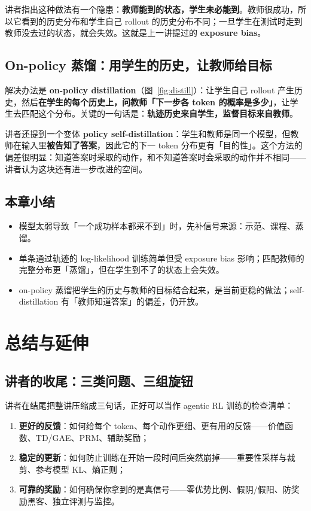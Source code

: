 \documentclass[a4paper]{article}
\begin{document}
讲者指出这种做法有一个隐患：\textbf{教师能到的状态，学生未必能到}。教师很成功，所以它看到的历史分布和学生自己 rollout 的历史分布不同；一旦学生在测试时走到教师没去过的状态，就会失效。这就是上一讲提过的 \textbf{exposure bias}。

\subsection{On-policy 蒸馏：用学生的历史，让教师给目标}

解决办法是 \textbf{on-policy distillation}（图~\ref{fig:distill}）：让学生自己 rollout 产生历史，然后\textbf{在学生的每个历史上，问教师「下一步各 token 的概率是多少」}，让学生去匹配这个分布。关键的一句话是：\textbf{轨迹历史来自学生，监督目标来自教师}。

讲者还提到一个变体 \textbf{policy self-distillation}：学生和教师是同一个模型，但教师在输入里\textbf{被告知了答案}，因此它的下一 token 分布更有「目的性」。这个方法的偏差很明显：知道答案时采取的动作，和不知道答案时会采取的动作并不相同——讲者认为这块还有进一步改进的空间。

\subsection{本章小结}

\begin{itemize}
\item 模型太弱导致「一个成功样本都采不到」时，先补信号来源：示范、课程、蒸馏。
\item 单条通过轨迹的 log-likelihood 训练简单但受 exposure bias 影响；匹配教师的完整分布更「蒸馏」，但在学生到不了的状态上会失效。
\item on-policy 蒸馏把学生的历史与教师的目标结合起来，是当前更稳的做法；self-distillation 有「教师知道答案」的偏差，仍开放。
\end{itemize}

\section{总结与延伸}

\subsection{讲者的收尾：三类问题、三组旋钮}

讲者在结尾把整讲压缩成三句话，正好可以当作 agentic RL 训练的检查清单：

\begin{enumerate}
\item \textbf{更好的反馈}：如何给每个 token、每个动作更细、更有用的反馈——价值函数、TD/GAE、PRM、辅助奖励；
\item \textbf{稳定的更新}：如何防止训练在开始一段时间后突然崩掉——重要性采样与裁剪、参考模型 KL、熵正则；
\item \textbf{可靠的奖励}：如何确保你拿到的是真信号——零优势比例、假阴/假阳、防奖励黑客、独立评测与监控。
\end{enumerate}
\end{document}
